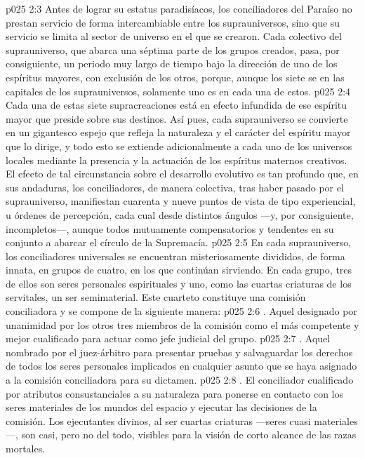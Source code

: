 \vs p025 2:3 Antes de lograr su estatus paradisíacos, los conciliadores del Paraíso no prestan servicio de forma intercambiable entre los suprauniversos, sino que su servicio se limita al sector de universo en el que se crearon. Cada colectivo del suprauniverso, que abarca una séptima parte de los grupos creados, pasa, por consiguiente, un periodo muy largo de tiempo bajo la dirección de uno de los espíritus mayores, con exclusión de los otros, porque, aunque los siete se  en las capitales de los suprauniversos, solamente uno es  en cada una de estos.
\vs p025 2:4 Cada una de estas siete supracreaciones está en efecto infundida de ese espíritu mayor que preside sobre sus destinos. Así pues, cada suprauniverso se convierte en un gigantesco espejo que refleja la naturaleza y el carácter del espíritu mayor que lo dirige, y todo esto se extiende adicionalmente a cada uno de los universos locales mediante la presencia y la actuación de los espíritus maternos creativos. El efecto de tal circunstancia sobre el desarrollo evolutivo es tan profundo que, en sus andaduras, los conciliadores, de manera colectiva, tras haber pasado por el suprauniverso, manifiestan cuarenta y nueve puntos de vista de tipo experiencial, u órdenes de percepción, cada cual desde distintos ángulos ---y, por consiguiente, incompletos---, aunque todos mutuamente compensatorios y tendentes en su conjunto a abarcar el círculo de la Supremacía.
\vs p025 2:5 \pc En cada suprauniverso, los conciliadores universales se encuentran misteriosamente divididos, de forma innata, en grupos de cuatro, en los que continúan sirviendo. En cada grupo, tres de ellos son seres personales espirituales y uno, como las cuartas criaturas de los servitales, un ser semimaterial. Este cuarteto constituye una comisión conciliadora y se compone de la siguiente manera:
\vs p025 2:6 . Aquel designado por unanimidad por los otros tres miembros de la comisión como el más competente y mejor cualificado para actuar como jefe judicial del grupo.
\vs p025 2:7 . Aquel nombrado por el juez\hyp{}árbitro para presentar pruebas y salvaguardar los derechos de todos los seres personales implicados en cualquier asunto que se haya asignado a la comisión conciliadora para su dictamen.
\vs p025 2:8 . El conciliador cualificado por atributos consustanciales a su naturaleza para ponerse en contacto con los seres materiales de los mundos del espacio y ejecutar las decisiones de la comisión. Los ejecutantes divinos, al ser cuartas criaturas ---seres cuasi materiales---, son casi, pero no del todo, visibles para la visión de corto alcance de las razas mortales.
